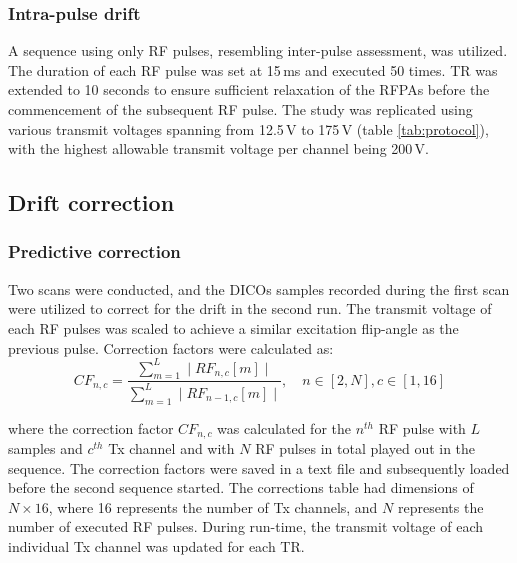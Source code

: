 \subsubsection{Intra-pulse drift}
A sequence using only RF pulses, resembling inter-pulse assessment, was utilized. The duration of each RF pulse was set at 15\,ms and executed 50 times. TR was extended to 10 seconds to ensure sufficient relaxation of the RFPAs before the commencement of the subsequent RF pulse.  The study was replicated using various  transmit voltages spanning from 12.5\,V to 175\,V (table \ref{tab:protocol}), with the highest allowable transmit voltage per channel being 200\,V.



\subsection{Drift correction}
\subsubsection{Predictive correction }
Two scans were conducted, and the DICOs samples recorded during the first scan were utilized to correct for the drift in the second run. The transmit voltage of each RF pulses was scaled to achieve a similar excitation flip-angle as the previous pulse. Correction factors were calculated as:
\begin{equation}
CF_{n,c} = \frac{\sum_{m=1}^L \mid RF_{n,c}[m]\mid}{\sum_{m=1}^L \mid RF_{n-1,c}[m]\mid}, \quad n\in\left[2, N\right], c\in\left[1, 16\right] \label{eq:predictive_eq}
\end{equation}

where the correction factor $CF_{n,c}$ was calculated for the $n^{th}$ RF pulse with $L$ samples and $c^{th}$ Tx channel and with $N$ RF pulses in total played out in the sequence. 
The correction factors were saved in a text file and subsequently loaded before the second sequence started. The corrections table had dimensions of $N \times 16$, where 16 represents the number of Tx channels, and $N$ represents the number of executed RF pulses. During run-time, the transmit voltage of each individual Tx channel was updated for each TR.


